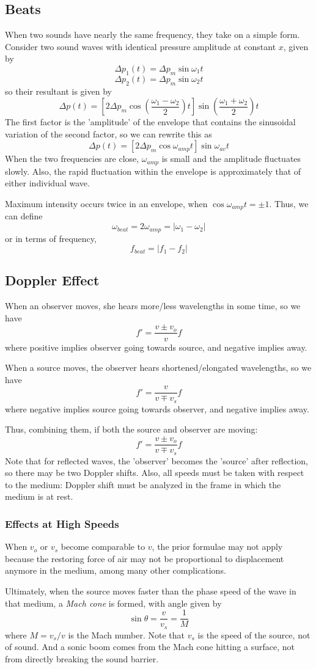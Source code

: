 \documentclass[../PhysicsFormulae.tex]{subfiles}
\begin{document}
\subsection{Beats}
When two sounds have nearly the same frequency, they take on a simple form. Consider two sound waves with identical pressure amplitude at constant $x$, given by
\[ \Delta p_1(t) = \Delta p_m \sin{\omega_1 t} \]
\[ \Delta p_2(t) = \Delta p_m \sin{\omega_2 t} \]
so their resultant is given by 
\[ \Delta p(t) = \left[2\Delta p_m \cos{\left(\frac{\omega_1 - \omega_2}{2}\right)t}\right] \sin{\left(\frac{\omega_1 + \omega_2}{2}\right)t} \]
The first factor is the 'amplitude' of the envelope that contains the sinusoidal variation of the second factor, so we can rewrite this as 
\[ \Delta p(t) = [2\Delta p_m \cos{\omega_{amp}t}] \sin{\omega_{av}t} \]
When the two frequencies are close, $\omega_{amp}$ is small and the amplitude fluctuates slowly. Also, the rapid fluctuation within the envelope is approximately that of either individual wave. \bigskip

Maximum intensity occurs twice in an envelope, when $\cos{\omega_{amp}t} = \pm 1$. Thus, we can define
\[ \omega_{beat} = 2\omega_{amp} = |\omega_1 - \omega_2| \]
or in terms of frequency, 
\[ f_{beat} = |f_1 - f_2| \]

\subsection{Doppler Effect}
When an observer moves, she hears more/less wavelengths in some time, so we have
\[ f' = \frac{v \pm v_o}{v}f \]
where positive implies observer going towards source, and negative implies away.\bigskip

When a source moves, the observer hears shortened/elongated wavelengths, so we have
\[ f' = \frac{v}{v \mp v_s}f \]
where negative implies source going towards observer, and negative implies away.\bigskip

Thus, combining them, if both the source and observer are moving: 
\[ f' = \frac{v \pm v_o}{v \mp v_s}f \]
Note that for reflected waves, the 'observer' becomes the 'source' after reflection, so there may be two Doppler shifts. Also, all speeds must be taken with respect to the medium: Doppler shift must be analyzed in the frame in which the medium is at rest. 

\subsubsection{Effects at High Speeds}
When $v_o$ or $v_s$ become comparable to $v$, the prior formulae may not apply because the restoring force of air may not be proportional to displacement anymore in the medium, among many other complications.\bigskip

Ultimately, when the source moves faster than the phase speed of the wave in that medium, a \textit{Mach cone} is formed, with angle given by 
\[ \sin{\theta} = \frac{v}{v_s} = \frac{1}{M} \]
where $M = v_s/v$ is the Mach number. Note that $v_s$ is the speed of the source, not of sound. And a sonic boom comes from the Mach cone hitting a surface, not from directly breaking the sound barrier. 
\end{document}
